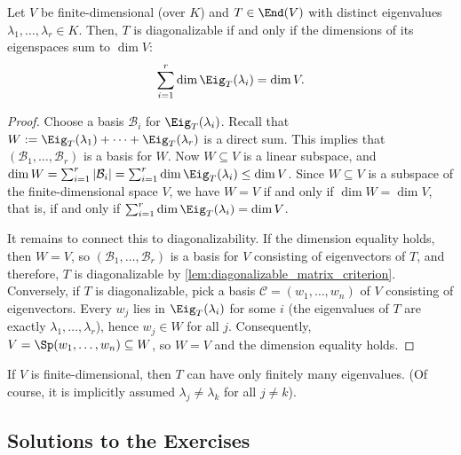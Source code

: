 \begin{corollary}\label{cor:diagonalizability_eigenspaces}
  Let $V$ be finite-di\-men\-sional (over $K$) and $T \in \End(V)$ with distinct eigenvalues $\lambda_1, \dots, \lambda_r \in K$. Then, $T$ is diagonalizable if and only if the dimensions of its eigenspaces sum to $\dim V$:
  \[ \sum_{i=1}^r \dim \Eig_T(\lambda_i) = \dim V. \]
\end{corollary}

\begin{proof}
  Choose a basis $\mathcal{B}_i$ for $\Eig_T(\lambda_i)$. Recall that $W := \Eig_T(\lambda_1) + \dots + \Eig_T(\lambda_r)$ is a direct sum.
  This implies that $(\mathcal{B}_1, \dots, \mathcal{B}_r)$ is a basis for $W$.
  Now $W \subseteq V$ is a linear subspace, and $\dim W = \sum_{i=1}^r |\mathcal{B}_i| = \sum_{i=1}^r \dim \Eig_T(\lambda_i) \le \dim V$.
  Since $W \subseteq V$ is a subspace of the finite-di\-men\-sional space $V$, we have $W = V$ if and only if $\dim W = \dim V$, that is, if and only if $\sum_{i=1}^r \dim \Eig_T(\lambda_i) = \dim V$.

  It remains to connect this to diagonalizability. If the dimension equality holds, then $W = V$, so $(\mathcal{B}_1, \dots, \mathcal{B}_r)$ is a basis for $V$ consisting of eigenvectors of $T$, and therefore, $T$ is diagonalizable by \cref{lem:diagonalizable_matrix_criterion}. Conversely, if $T$ is diagonalizable, pick a basis $\mathcal{C} = (w_1, \dots, w_n)$ of $V$ consisting of eigenvectors. Every $w_j$ lies in $\Eig_T(\lambda_i)$ for some $i$ (the eigenvalues of $T$ are exactly $\lambda_1, \dots, \lambda_r$), hence $w_j \in W$ for all $j$. Consequently, $V = \Sp(w_1, \dots, w_n) \subseteq W$, so $W = V$ and the dimension equality holds.
\end{proof}

\begin{exercise}\label{ex:finite_eigenvalues}
  If $V$ is finite-di\-men\-sional, then $T$ can have only finitely many eigenvalues. (Of course, it is implicitly assumed $\lambda_j \ne \lambda_k$ for all $j \ne k$).
\end{exercise}

\subsection{Solutions to the Exercises}
\label{sec:solutions_eigen_motivation}

